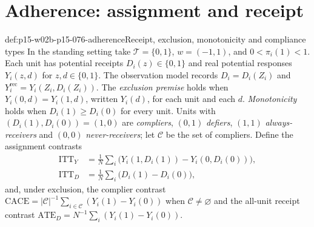 \section{Adherence: assignment and receipt}
\label{sec:p15-w02b-p15-076-adherence}

\begin{hbdefinition}{def:p15-w02b-p15-076-adherence}{Receipt, exclusion, monotonicity and compliance types}
In the standing setting take \(\mathcal T=\{0,1\}\), \(w=(-1,1)\), and
\(0<\pi_i(1)<1\). Each unit has potential receipts \(D_i(z)\in\{0,1\}\)
and real potential responses \(Y_i(z,d)\) for \(z,d\in\{0,1\}\). The
observation model records \(D_i=D_i(Z_i)\) and
\(Y_i^{\mathrm{rec}}=Y_i(Z_i,D_i(Z_i))\). The \emph{exclusion premise}
holds when \(Y_i(0,d)=Y_i(1,d)\), written \(Y_i(d)\), for each unit and
each \(d\). \emph{Monotonicity} holds when \(D_i(1)\geq D_i(0)\) for
every unit. Units with \((D_i(1),D_i(0))=(1,0)\) are \emph{compliers},
\((0,1)\) \emph{defiers}, \((1,1)\) \emph{always-receivers} and \((0,0)\)
\emph{never-receivers}; let \(\mathcal C\) be the set of compliers. Define
the assignment contrasts
\[
 \begin{aligned}
 \mathrm{ITT}_Y&=\frac1N\sum_i\bigl(Y_i(1,D_i(1))-Y_i(0,D_i(0))\bigr),\\
 \mathrm{ITT}_D&=\frac1N\sum_i\bigl(D_i(1)-D_i(0)\bigr),
 \end{aligned}
\]
and, under exclusion, the complier contrast
\(\mathrm{CACE}=|\mathcal C|^{-1}\sum_{i\in\mathcal C}(Y_i(1)-Y_i(0))\)
when \(\mathcal C\ne\varnothing\) and the all-unit receipt contrast
\(\mathrm{ATE}_D=N^{-1}\sum_i(Y_i(1)-Y_i(0))\).
\end{hbdefinition}

